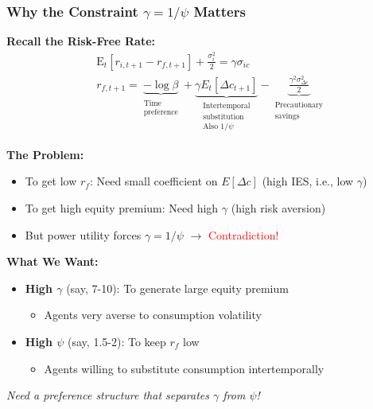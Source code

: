 \documentclass{beamer}
\begin{document}
\begin{frame}
    \frametitle{Why the Constraint $\gamma = 1/\psi$ Matters}
    
    \textbf{Recall the Risk-Free Rate:}
    \begin{align*}
    &\mathrm{E}_t\left[r_{i, t+1}-r_{f, t+1}\right]+\frac{\sigma_i^2}{2}=\gamma \sigma_{i c}\\
    &r_{f,t+1} = \underbrace{-\log \beta}_{\substack{\text{Time} \\ \text{preference}}} + \underbrace{\gamma E_t[\Delta c_{t+1}]}_{\substack{\text{Intertemporal} \\ \text{substitution} \\ \text{Also } 1/\psi}} - \underbrace{\frac{\gamma^2 \sigma_{\Delta c}^2}{2}}_{\substack{\text{Precautionary} \\ \text{savings}}}
    \end{align*}

    
    \textbf{The Problem:}
    \begin{itemize}
        \item To get low $r_f$: Need small coefficient on $E[\Delta c]$ (high IES, i.e., low $\gamma$)
        \item To get high equity premium: Need high $\gamma$ (high risk aversion)
        \item But power utility forces $\gamma = 1/\psi$ $\rightarrow$ \textcolor{red}{Contradiction!}
    \end{itemize}
    
    
    \textbf{What We Want:}
    \begin{itemize}
        \item \textbf{High $\gamma$} (say, 7-10): To generate large equity premium
        \begin{itemize}
            \item Agents very averse to consumption volatility
        \end{itemize}
        \item \textbf{High $\psi$} (say, 1.5-2): To keep $r_f$ low
        \begin{itemize}
            \item Agents willing to substitute consumption intertemporally
        \end{itemize}
    \end{itemize}
    
    
    \textit{Need a preference structure that separates $\gamma$ from $\psi$!}
    
\end{frame}
\end{document}
